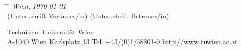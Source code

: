 \begin{titlepage}
\begin{flushleft}
\begin{tabbing}%
\hspace{4.5cm} \= \hspace{5cm} \= \hspace{5cm} \kill
\textit{Wien, \today} \> \underline{\hspace*{5cm}} \> \hspace{0.8cm} \underline{\hspace*{5cm}} \\
     \> \hspace{0.1cm} (Unterschrift Verfasser/in) \> \hspace{1.0cm} (Unterschrift Betreuer/in) \\
\end{tabbing}
\end{flushleft}

\vspace{0.9cm}

\begin{minipage}[b]{1.0\linewidth}
\begin{center}
\underline{\hspace*{15.5cm}}
\scriptsize{
Technische Universit\"{a}t Wien \\
A-1040 Wien \hspace{0.5cm} Karlsplatz 13 \hspace{0.5cm} Tel. +43/(0)1/58801-0 \hspace{0.5cm} http://www.tuwien.ac.at
}
\end{center}
\end{minipage}

\vspace*{-2.5cm}

\end{titlepage}

%
%
